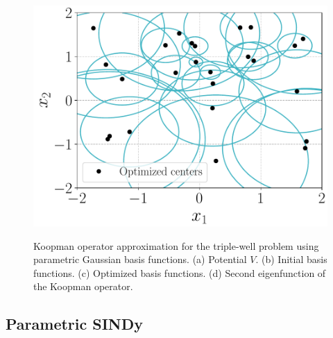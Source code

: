 \documentclass
[
    a4paper,
    DIV=11,
    abstract=true,
    11pt,
]
{scrartcl}
\theoremstyle{definition}
\begin{document}
\begin{figure}
\begin{minipage}[t]{0.4\linewidth}
{        \includegraphics[width=0.9\linewidth]{final_basis_tw2d}}
    \end{minipage}
    \begin{minipage}[t]{0.4\linewidth}
        \centering
    \end{minipage}
    \caption{Koopman operator approximation for the triple-well problem using parametric Gaussian basis functions. (a) Potential $ V $. (b) Initial basis functions. (c) Optimized basis functions. (d) Second eigenfunction of the Koopman operator.}
    \label{fig:TW_results}
\end{figure}

\subsection{Parametric SINDy}
\end{document}
